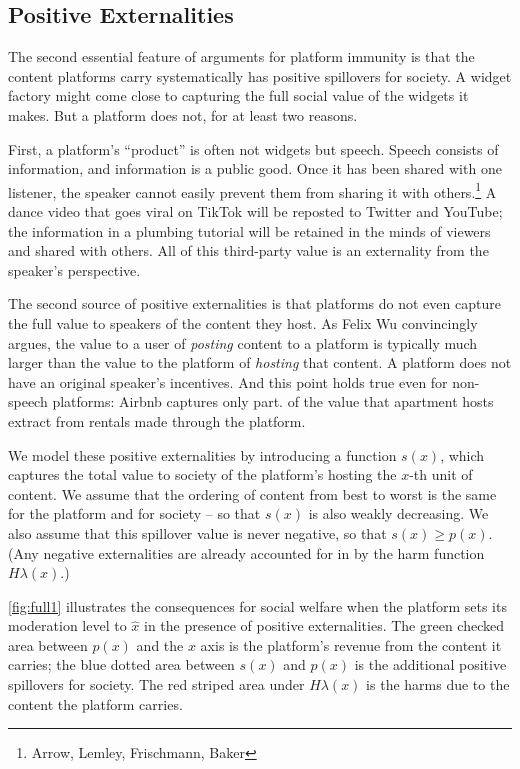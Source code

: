 \subsection{Positive Externalities}

The second essential feature of arguments for platform immunity is that the content platforms carry systematically has positive spillovers for society. A widget factory might come close to capturing the full social value of the widgets it makes. But a platform does not, for at least two reasons.

First, a platform's ``product'' is often not widgets but speech. Speech consists of information, and information is a public good. Once it has been shared with one listener, the speaker cannot easily prevent them from sharing it with others.\footnote{Arrow, Lemley, Frischmann, Baker} A dance video that goes viral on TikTok will be reposted to Twitter and YouTube; the information in a plumbing tutorial will be retained in the minds of viewers and shared with others. All of this third-party value is an externality from the speaker's perspective.

The second source of positive externalities is that platforms do not even capture the full value to speakers of the content they host. As Felix Wu convincingly argues, the value to a user of \emph{posting} content to a platform is typically much larger than the value to the platform of \emph{hosting} that content. A platform does not have an original speaker's incentives. And this point holds true even for non-speech platforms: Airbnb captures only part. of the value that apartment hosts extract from rentals made through the platform.

We model these positive externalities by introducing a function $s(x)$, which captures the total value to society of the platform's hosting the $x$-th unit of content. We assume that the ordering of content from best to worst is the same for the platform and for society -- so that $s(x)$ is also weakly decreasing. We also assume that this spillover value is never negative, so that $s(x) \ge p(x)$. (Any negative externalities are already accounted for in by the harm function $H\lambda(x)$.)

\autoref{fig:full1} illustrates the consequences for social welfare when the platform sets its moderation level to $\hat{x}$ in the presence of positive externalities. The green checked area between $p(x)$ and the $x$ axis is the platform's revenue from the content it carries; the blue dotted area between $s(x)$ and $p(x)$ is the additional positive spillovers for society. The red striped area under $H\lambda(x)$ is the harms due to the content the platform carries.

